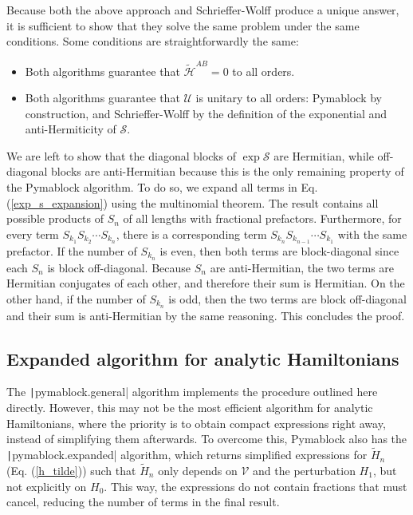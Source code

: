 Because both the above approach and Schrieffer-Wolff produce a unique answer, it
is sufficient to show that they solve the same problem under the same
conditions.
Some conditions are straightforwardly the same:

\begin{itemize}
\item Both algorithms guarantee that $\tilde{\mathcal{H}}^{AB} = 0$ to all orders.
\item Both algorithms guarantee that $\mathcal{U}$ is unitary to all orders:
Pymablock by construction, and Schrieffer-Wolff by the
definition of the exponential and anti-Hermiticity of $\mathcal{S}$.
\end{itemize}

We are left to show that the diagonal blocks of $\exp \mathcal{S}$ are
Hermitian, while off-diagonal blocks are anti-Hermitian because this is the
only remaining property of the Pymablock algorithm.
To do so, we expand all terms in Eq. (\ref{exp_s_expansion}) using the multinomial theorem.
The result contains all possible products of $S_n$ of all lengths with fractional prefactors.
Furthermore, for every term $S_{k_1}S_{k_2}\cdots S_{k_n}$, there is a
corresponding term $S_{k_n}S_{k_{n -1}}\cdots S_{k_1}$ with the same prefactor.
If the number of $S_{k_n}$ is even, then both terms are block-diagonal since
each $S_n$ is block off-diagonal.
Because $S_n$ are anti-Hermitian, the two terms are Hermitian conjugates of each
other, and therefore their sum is Hermitian.
On the other hand, if the number of $S_{k_n}$ is odd, then the two terms are
block off-diagonal and their sum is anti-Hermitian by the same reasoning.
This concludes the proof.

\subsection{Expanded algorithm for analytic Hamiltonians}

The \texttt|pymablock.general| algorithm implements the procedure outlined here directly.
However, this may not be the most efficient algorithm for analytic Hamiltonians,
where the priority is to obtain compact expressions right away, instead of
simplifying them afterwards.
To overcome this, Pymablock also has the \texttt|pymablock.expanded| algorithm, which
returns simplified expressions for $\tilde{H}_{n}$ (Eq. (\ref{h_tilde})) such
that $\tilde{H}_{n}$ only depends on $\mathcal{V}$ and the perturbation $H_1$, but not
explicitly on $H_0$.
This way, the expressions do not contain fractions that must cancel, reducing
the number of terms in the final result.

